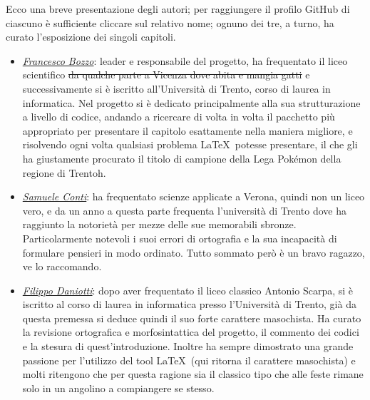 \documentclass[class=book, crop=false, oneside]{standalone}
\begin{document}
Ecco una breve presentazione degli autori; per raggiungere il profilo GitHub di ciascuno è sufficiente cliccare sul relativo nome; ognuno dei tre, a turno, ha curato l'esposizione dei singoli capitoli.
\begin{itemize}
  \item \emph{\href{https://github.com/FrancescoBozzo}{Francesco Bozzo}}: leader e responsabile del progetto, ha frequentato il liceo scientifico \sout{da qualche parte a Vicenza dove abita e mangia gatti} e successivamente si è iscritto all'Università di Trento, corso di laurea in informatica. Nel progetto si è dedicato principalmente alla sua strutturazione a livello di codice, andando a ricercare di volta in volta il pacchetto più appropriato per presentare il capitolo esattamente nella maniera migliore, e risolvendo ogni volta qualsiasi problema \LaTeX\ potesse presentare, il che gli ha giustamente procurato il titolo di campione della Lega Pokémon della regione di Trentoh.
  \item \emph{\href{https://github.com/Samaretas}{Samuele Conti}}: ha frequentato scienze applicate a Verona, quindi non un liceo vero, e da un anno a questa parte frequenta l'università di Trento dove ha raggiunto la notorietà per mezze delle sue memorabili sbronze. Particolarmente notevoli i suoi errori di ortografia e la sua incapacità di formulare pensieri in modo ordinato. Tutto sommato però è un bravo ragazzo, ve lo raccomando.
  \item \emph{\href{https://github.com/filippodaniotti}{Filippo Daniotti}}: dopo aver frequentato il liceo classico Antonio Scarpa, si è iscritto al corso di laurea in informatica presso l'Università di Trento, già da questa premessa si deduce quindi il suo forte carattere masochista. Ha curato la revisione ortografica e morfosintattica del progetto, il commento dei codici e la stesura di quest'introduzione. Inoltre ha sempre dimostrato una grande passione per l'utilizzo del tool \LaTeX\ (qui ritorna il carattere masochista) e molti ritengono che per questa ragione sia il classico tipo che alle feste rimane solo in un angolino a compiangere se stesso.
\end{itemize}
\end{document}
